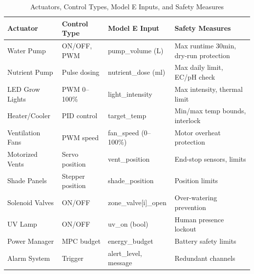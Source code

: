 \documentclass[conference]{IEEEtran}
\begin{document}
\begin{table}[!t]
\caption{Actuators, Control Types, Model E Inputs, and Safety Measures}
\centering
\small
\begin{tabular}{|l|l|l|p{3.5cm}|}
\hline
\textbf{Actuator} & \textbf{Control Type} & \textbf{Model E Input} & \textbf{Safety Measures} \\
\hline
Water Pump & ON/OFF, PWM & pump\_volume (L) & Max runtime 30min, dry-run protection \\
Nutrient Pump & Pulse dosing & nutrient\_dose (ml) & Max daily limit, EC/pH check \\
LED Grow Lights & PWM 0--100\% & light\_intensity & Max intensity, thermal limit \\
Heater/Cooler & PID control & target\_temp & Min/max temp bounds, interlock \\
Ventilation Fans & PWM speed & fan\_speed (0--100\%) & Motor overheat protection \\
Motorized Vents & Servo position & vent\_position & End-stop sensors, limits \\
Shade Panels & Stepper position & shade\_position & Position limits \\
Solenoid Valves & ON/OFF & zone\_valve[i]\_open & Over-watering prevention \\
UV Lamp & ON/OFF & uv\_on (bool) & Human presence lockout \\
Power Manager & MPC budget & energy\_budget & Battery safety limits \\
Alarm System & Trigger & alert\_level, message & Redundant channels \\
\hline
\end{tabular}
\label{tab:actuators}
\end{table}
\end{document}
